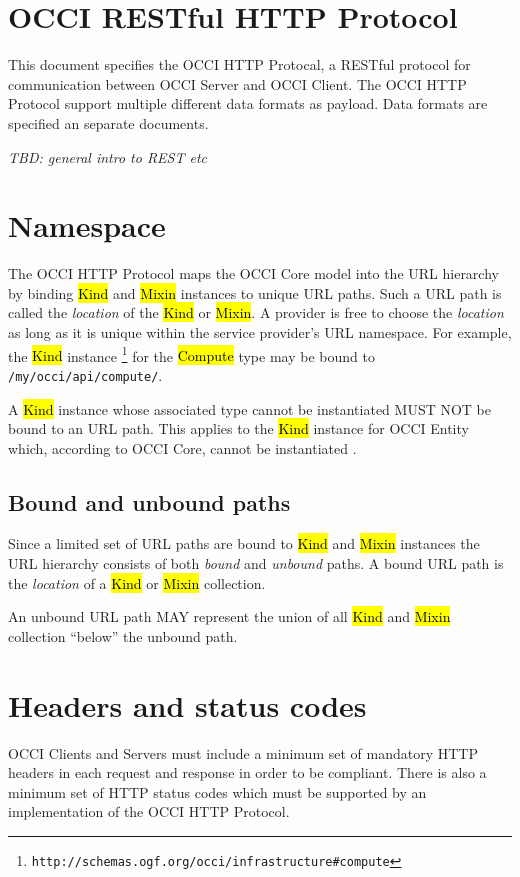 \documentclass[10pt,a4paper]{article}
\begin{document}
\section{OCCI RESTful HTTP Protocol}

This document specifies the OCCI HTTP Protocal, a RESTful protocol for
communication between OCCI Server and OCCI Client. The OCCI HTTP Protocol
support multiple different data formats as payload. Data formats are specified
an separate documents.

{\em TBD: general intro to REST etc}

\section{Namespace}

The OCCI HTTP Protocol maps the OCCI Core model into the URL hierarchy by binding
\hl{Kind} and \hl{Mixin} instances to unique URL paths. Such a URL path is called
the {\em location} of the \hl{Kind} or \hl{Mixin}.
A provider is free to choose the {\em location} as long as it is unique
within the service provider's URL namespace.
For example, the \hl{Kind} instance%
\footnote{\tt http://schemas.ogf.org/occi/infrastructure\#compute}
for the \hl{Compute} type may be bound to {\tt /my/occi/api/compute/}.

A \hl{Kind} instance whose associated type cannot be instantiated MUST NOT be
bound to an URL path. This applies to the \hl{Kind} instance for OCCI Entity
which, according to OCCI Core, cannot be instantiated \cite{occi:core}.

\subsection{Bound and unbound paths}

Since a limited set of URL paths are bound to \hl{Kind} and \hl{Mixin}
instances the URL hierarchy consists of both {\em bound} and {\em unbound}
paths.
A bound URL path is the {\em location} of a \hl{Kind} or \hl{Mixin} collection.

An unbound URL path MAY represent the union of all \hl{Kind} and \hl{Mixin}
collection ``below'' the unbound path.

\section{Headers and status codes}

OCCI Clients and Servers must include a minimum set of mandatory HTTP headers
in each request and response in order to be compliant.
There is also a minimum set of HTTP status codes which must be supported by
an implementation of the OCCI HTTP Protocol.
\end{document}
